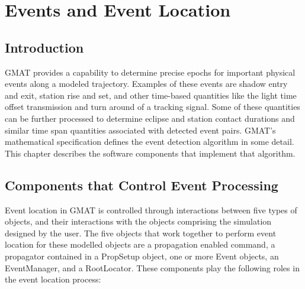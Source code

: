 \chapter{\label{ch:EventLocation}Events and Event Location}


\section{Introduction}

GMAT provides a capability to determine precise epochs for important physical events along a modeled trajectory.  Examples of these events are shadow entry and exit, station rise and set, and other time-based quantities like the light time offset transmission and turn around of a tracking signal. Some of these quantities can be further processed to determine eclipse and station contact durations and similar time span quantities associated with detected event pairs.  GMAT's mathematical specification\cite{mathSpec} defines the event detection algorithm in some detail.  This chapter describes the software components that implement that algorithm.

\section{Components that Control Event Processing}

Event location in GMAT is controlled through interactions between five types of objects, and their interactions with the objects comprising the simulation designed by the user.  The five objects that work together to perform event location for these modelled objects are a propagation enabled command, a propagator contained in a PropSetup object, one or more Event objects, an EventManager, and a RootLocator.  These components play the following roles in the event location process:

